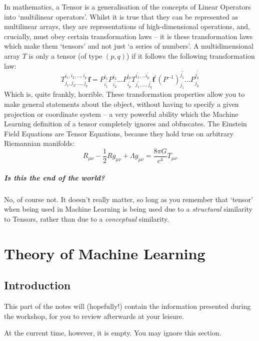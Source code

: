 \documentclass[a4paper,openany,11pt]{book}
\renewcommand\vec[1]{\boldsymbol{\mathbf{#1}}}
\begin{document}
			In mathematics, a Tensor is a generalisation of the concepts of Linear Operators into `multilinear operators'. Whilst it is true that they can be represented as multilinear arrays, they are representations of high-dimensional operations, and, crucially, must obey certain transformation laws -- it is these transformation laws which make them `tensors' and not just `a series of numbers'. A multidimensional array $T$ is only a tensor (of type $(p,q)$) if it follows the following transformation law:
			\begin{equation}
				T^{i_1,i_2,...,i_p}_{j_1,j_2,...,j_q} \vec{f} = P^{i_1}_{i^\prime_1} P^{i_2}_{i^\prime_2}...P^{i_p}_{i^\prime_p} T^{i^\prime_1,...i^\prime_p}_{j^\prime_1,...,j^\prime_q} \vec{f}^\prime (P^{-1})^{j^\prime_1}_{j_1} ...P^{j^\prime_q}_{j_q}
			\end{equation}
			Which is, quite frankly, horrible. These transformation properties allow you to make general statements about the object, without having to specify a given projection or coordinate system -- a very powerful ability which the Machine Learning definition of a tensor completely ignores and obfuscates. The Einstein Field Equations are Tensor Equations, because they hold true on arbitrary Riemannian manifolds:
			\begin{equation}
				R_{\mu\nu} - \frac{1}{2} R g_{\mu\nu} + \Lambda g_{\mu\nu} = \frac{8 \pi G}{c^4} T_{\mu \nu}
			\end{equation}



			\subsubsection{Is this the end of the world?}

			No, of course not. It doesn't really matter, so long as you remember that `tensor' when being used in Machine Learning is being used due to a \textit{structural} similarity to Tensors, rather than due to a \textit{conceptual} similarity.

	\part{Theory of Machine Learning}

		\chapter*{Introduction}

			This part of the notes will (hopefully!) contain the information presented during the workshop, for you to review afterwards at your leisure. 

			At the current time, however, it is empty. You may ignore this section.
\end{document}
